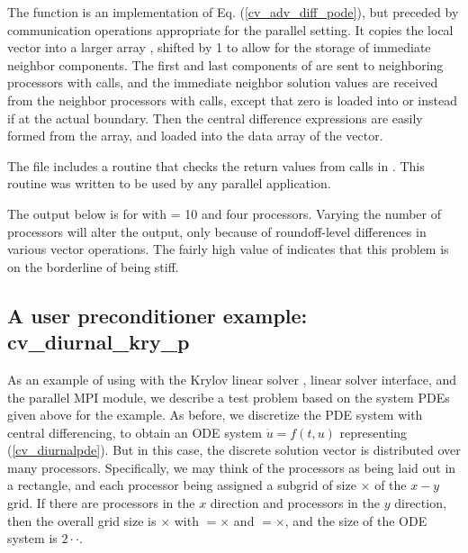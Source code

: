 The  function is an implementation of Eq. (\ref{cv_adv_diff_pode}), but preceded
by communication operations appropriate for the parallel setting.
It copies the local vector  into a larger array , shifted by 1
to allow for the storage of immediate neighbor components.  The first and last
components of  are sent to neighboring processors with  calls,
and the immediate neighbor solution values are received from the neighbor
processors with  calls, except that zero is loaded into 
or  instead if at the actual boundary.  Then the central
difference expressions are easily formed from the  array, and loaded into
the data array of the  vector.

The  file includes a routine  that checks the
return values from calls in .  This routine was written to be used
by any parallel {\sundials} application.

The output below is for  with  = 10 and four processors.
Varying the number of processors will alter the output, only because
of roundoff-level differences in various vector operations.  The fairly
high value of  indicates that this problem is on the borderline
of being stiff.



\subsection{A user preconditioner example: cv\_diurnal\_kry\_p}\label{ss:cv_diurnal_p}

As an example of using {\cvode} with the Krylov linear solver
{\sunlinsolspgmr}, {\cvls} linear solver interface, and
the parallel MPI {\nvecp} module, we describe a test problem based on
the system PDEs given above for the  example.
As before, we discretize the PDE system with central differencing, to
obtain an ODE system $\dot{u} = f(t,u)$ representing (\ref{cv_diurnalpde}).
But in this case, the discrete solution vector is distributed over
many processors.  Specifically, we may think of the processors as
being laid out in a rectangle, and each processor being assigned a
subgrid of size $\times$ of the $x-y$ grid. If
there are  processors in the $x$ direction and 
processors in the $y$ direction, then the overall grid size is
$\times$ with $=$$\times$ and
$=$$\times$, and the size of the ODE system is
$2\cdot$$\cdot$.

